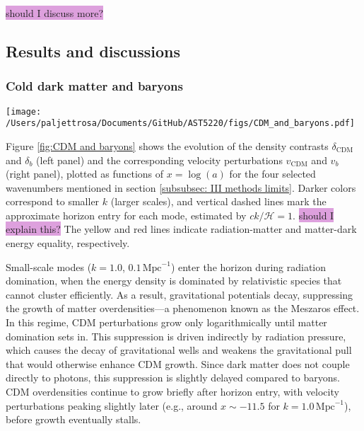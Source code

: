 \documentclass{aa}
\numberwithin{equation}{section}
\numberwithin{table}{section}
\numberwithin{figure}{section}
\begin{document}
\colorbox{Plum}{should I discuss more?}



\subsection{Results and discussions}\label{subsec: III results}

\subsubsection{Cold dark matter and baryons}

\begin{figure*}
  \centering
  \texttt{[image: /Users/paljettrosa/Documents/GitHub/AST5220/figs/CDM\_and\_baryons.pdf]}
  \caption{Evolution of the CDM (purple shades) and baryon (orange shades) density (left) and velocity (right) perturbations. Darker lines correspond to larger scales (smaller $k$, given in units of $\text{Mpc}^{-1}$). An asinh-scaling is used to highlight variations across several orders of magnitude and sign changes. Dashed lines indicate approximate horizon entry times for different modes, while the yellow and red vertical lines mark radiation-matter and matter-dark energy equality, respectively. \colorbox{Plum}{should I explain the asinh scaling?}}\label{fig:CDM and baryons}
\end{figure*}

Figure \ref{fig:CDM and baryons} shows the evolution of the density contrasts $\delta_\text{CDM}$ and $\delta_b$ (left panel) and the corresponding velocity perturbations $v_\text{CDM}$ and $v_b$ (right panel), plotted as functions of $x = \log (a)$ for the four selected wavenumbers mentioned in section \ref{subsubsec: III methods limits}. Darker colors correspond to smaller $k$ (larger scales), and vertical dashed lines mark the approximate horizon entry for each mode, estimated by $ck/\mathcal{H} = 1$. \colorbox{Plum}{should I explain this?} The yellow and red lines indicate radiation-matter and matter-dark energy equality, respectively.

Small-scale modes ($k = 1.0$, $0.1\,\text{Mpc}^{-1}$) enter the horizon during radiation domination, when the energy density is dominated by relativistic species that cannot cluster efficiently. As a result, gravitational potentials decay, suppressing the growth of matter overdensities—a phenomenon known as the Meszaros effect. In this regime, CDM perturbations grow only logarithmically until matter domination sets in. This suppression is driven indirectly by radiation pressure, which causes the decay of gravitational wells and weakens the gravitational pull that would otherwise enhance CDM growth. Since dark matter does not couple directly to photons, this suppression is slightly delayed compared to baryons. CDM overdensities continue to grow briefly after horizon entry, with velocity perturbations peaking slightly later (e.g., around $x \sim -11.5$ for $k = 1.0\,\text{Mpc}^{-1}$), before growth eventually stalls.
\end{document}
